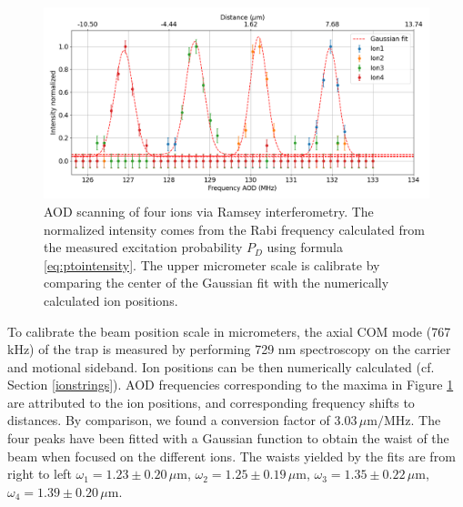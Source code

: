 \begin{figure}
\centering
\includegraphics[width=\textwidth]{img/AODScan2}
\caption{AOD scanning of four ions via Ramsey interferometry. The normalized intensity comes from the Rabi frequency calculated from the measured excitation probability $P_D$ using formula \eqref{eq:ptointensity}. The upper micrometer scale is calibrate by comparing the center of the Gaussian fit with the numerically calculated ion positions.}
\label{AODscan}
\end{figure}
To calibrate the beam position scale in micrometers, the axial COM mode (767 kHz) of the trap is measured by performing 729 nm spectroscopy on the carrier and motional sideband. Ion positions can be then numerically calculated (cf. Section \ref{ionstrings}). AOD frequencies corresponding to the maxima in Figure \ref{AODscan} are attributed to the ion positions, and corresponding frequency shifts to distances. By comparison, we found a conversion factor of $3.03\,\mu\text{m}/\text{MHz}$.
The four peaks have been fitted with a Gaussian function to obtain the waist of the beam when focused on the different ions. The waists yielded by the fits are from right to left $\omega_1 = 1.23\pm 0.20\,\mu$m, $\omega_2 = 1.25\pm 0.19\,\mu$m, $ \omega_3 = 1.35\pm 0.22\,\mu$m, $\omega_4 = 1.39\pm 0.20\,\mu$m.\par
